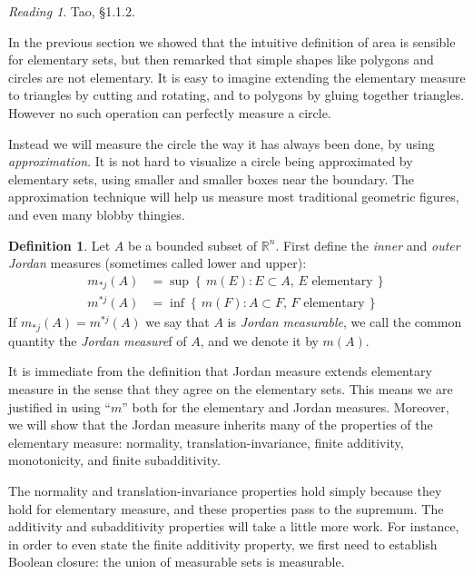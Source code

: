 \documentclass[11pt,oneside]{amsbook}
\newcommand{\set}[1]{\left\{\,#1\,\right\}}
\newcommand{\RR}{{\mathbb R}}
\theoremstyle{definition}
\theoremstyle{plain}
\theoremstyle{definition}
\newtheorem{defn}[thm]{Definition}
\theoremstyle{remark}
\newtheorem*{reading}{Reading}
\numberwithin{equation}{section}
\numberwithin{figure}{section}
\begin{document}

\begin{reading}
  Tao, \S1.1.2.
\end{reading}

In the previous section we showed that the intuitive definition of area is sensible for elementary sets, but then remarked that simple shapes like polygons and circles are not elementary. It is easy to imagine extending the elementary measure to triangles by cutting and rotating, and to polygons by gluing together triangles. However no such operation can perfectly measure a circle.

Instead we will measure the circle the way it has always been done, by using \emph{approximation}. It is not hard to visualize a circle being approximated by elementary sets, using smaller and smaller boxes near the boundary. The approximation technique will help us measure most traditional geometric figures, and even many blobby thingies.

\begin{defn}
  Let $A$ be a bounded subset of $\RR^n$. First define the \emph{inner} and \emph{outer Jordan} measures (sometimes called lower and upper):
  \begin{align*}
    m_{*j}(A)&=\sup\set{m(E):E\subset A,\, E\text{ elementary}}\\
    m^{*j}(A)&=\inf\set{m(F):A\subset F,\, F\text{ elementary}}
  \end{align*}
  If $m_{*j}(A)=m^{*j}(A)$ we say that $A$ is \emph{Jordan measurable}, we call the common quantity the \emph{Jordan measure}f of $A$, and we denote it by $m(A)$.
\end{defn}

It is immediate from the definition that Jordan measure extends elementary measure in the sense that they agree on the elementary sets. This means we are justified in using ``$m$'' both for the elementary and Jordan measures. Moreover, we will show that the Jordan measure inherits many of the properties of the elementary measure: normality, translation-invariance, finite additivity, monotonicity, and finite subadditivity.

The normality and translation-invariance properties hold simply because they hold for elementary measure, and these properties pass to the supremum. The additivity and subadditivity properties will take a little more work. For instance, in order to even state the finite additivity property, we first need to establish Boolean closure: the union of measurable sets is measurable.
\end{document}
